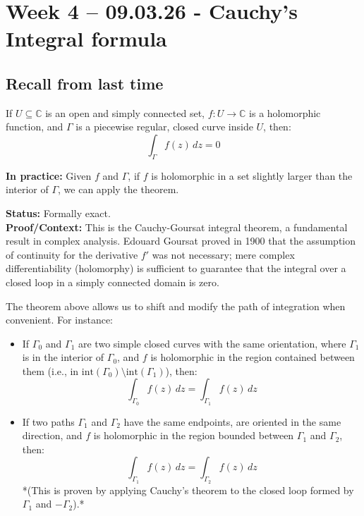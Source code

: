 \section{Week 4 -- 09.03.26 - Cauchy's Integral formula}

\subsection{Recall from last time}

\begin{theorem}
If $U \subseteq \mathbb{C}$ is an open and simply connected set, $f: U \rightarrow \mathbb{C}$ is a holomorphic function, and $\Gamma$ is a piecewise regular, closed curve inside $U$, then:
\begin{equation}
\int_{\Gamma} f(z) \, dz = 0
\end{equation}
\end{theorem}

\textbf{In practice:} Given $f$ and $\Gamma$, if $f$ is holomorphic in a set slightly larger than the interior of $\Gamma$, we can apply the theorem.

\begin{verification}
\textbf{Status:} Formally exact.\\
\textbf{Proof/Context:} This is the Cauchy-Goursat integral theorem, a fundamental result in complex analysis. Edouard Goursat proved in 1900 that the assumption of continuity for the derivative $f'$ was not necessary; mere complex differentiability (holomorphy) is sufficient to guarantee that the integral over a closed loop in a simply connected domain is zero.
\end{verification}

The theorem above allows us to shift and modify the path of integration when convenient. For instance:

\begin{itemize}
    \item If $\Gamma_0$ and $\Gamma_1$ are two simple closed curves with the same orientation, where $\Gamma_1$ is in the interior of $\Gamma_0$, and $f$ is holomorphic in the region contained between them (i.e., in $\text{int}(\Gamma_0) \setminus \text{int}(\Gamma_1)$), then:
    \begin{equation}
    \int_{\Gamma_0} f(z) \, dz = \int_{\Gamma_1} f(z) \, dz
    \end{equation}
    \item If two paths $\Gamma_1$ and $\Gamma_2$ have the same endpoints, are oriented in the same direction, and $f$ is holomorphic in the region bounded between $\Gamma_1$ and $\Gamma_2$, then:
    \begin{equation}
    \int_{\Gamma_1} f(z) \, dz = \int_{\Gamma_2} f(z) \, dz
    \end{equation}
    *(This is proven by applying Cauchy's theorem to the closed loop formed by $\Gamma_1$ and $-\Gamma_2$).*
\end{itemize}

